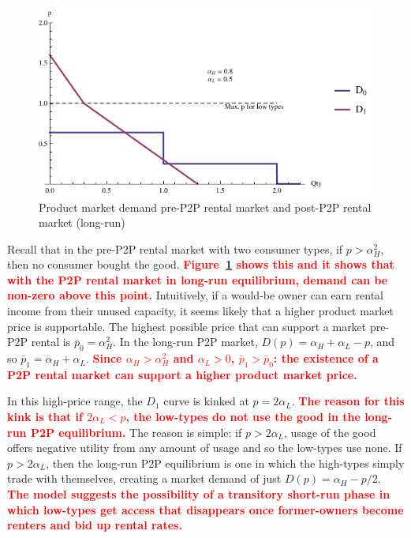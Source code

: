 \documentclass[11pt]{article}
\newcommand{\important}[1]{\textcolor{red}{\textbf{#1}}}
\newcommand{\important}[1]{#1}
\begin{document}
\begin{figure}
\caption{Product market demand pre-P2P rental market and post-P2P rental market (long-run)}
\label{fig:demand} 
\centering
\includegraphics[scale = 1]{./diagrams/p2plr_demand.pdf}
\end{figure} 

Recall that in the pre-P2P rental market with two consumer types, if $p > \alpha_H^2$, then no consumer bought the good. 
\important{Figure~\ref{fig:demand} shows this and it shows that with the P2P rental market in long-run equilibrium, demand can be non-zero above this point.}  
Intuitively, if a would-be owner can earn rental income from their unused capacity, it seems likely that a higher product market price is supportable. 
The highest possible price that can support a market pre-P2P rental is $\bar{p}_0 = \alpha_H^2$.  
In the long-run P2P market, $D(p) = \alpha_H + \alpha_L - p$, and so $\bar{p}_{1} = \alpha_H + \alpha_L$. 
\important{Since $\alpha_H > \alpha_H^2$ and $\alpha_L > 0$, $\bar{p}_1 > \bar{p}_0$: the existence of a P2P rental market can support a higher product market price.} 

In this high-price range, the $D_1$ curve is kinked at $p = 2\alpha_L$. 
\important{The reason for this kink is that if $2\alpha_L < p$, the low-types do not use the good in the long-run P2P equilibrium.} 
The reason is simple: if $p > 2\alpha_L$, usage of the good offers negative utility from any amount of usage and so the low-types use none. 
If $p > 2 \alpha_L$, then the long-run P2P equilibrium is one in which the high-types simply trade with themselves, creating a market demand of just $D(p) = \alpha_H - p/2$. 
\important{The model suggests the possibility of a transitory short-run phase in which low-types get access that disappears once former-owners become renters and bid up rental rates.} 
\end{document}
